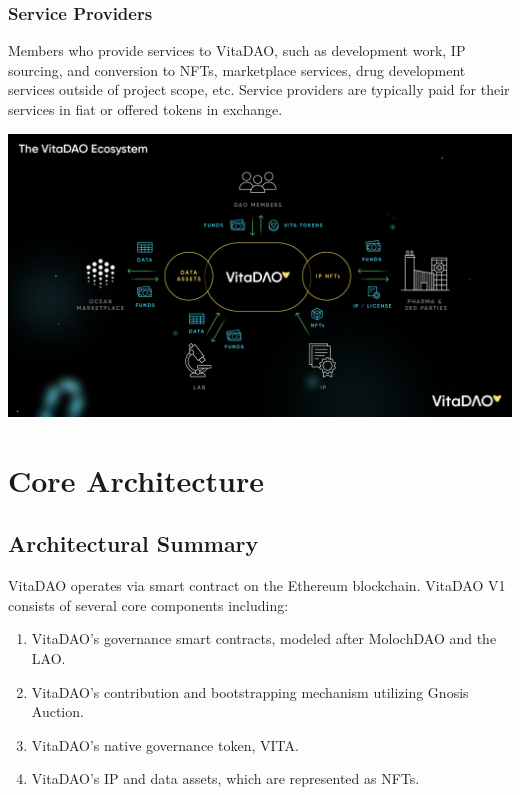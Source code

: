 \documentclass[12pt,letterpaper]{article}
\begin{document}
\subsubsection{Service Providers}
Members who provide services to VitaDAO, such as development work, IP sourcing, and conversion to NFTs, marketplace services, drug development services outside of project scope, etc. Service providers are typically paid for their services in fiat or offered tokens in exchange.

\vspace{15pt}
\begin{center}
\includegraphics[width=\linewidth]{images/VitaDAO Diagram - Ecosystem-p-1600.png} 
\end{center}

\section{Core Architecture}

\subsection{Architectural Summary}
VitaDAO operates via smart contract on the Ethereum blockchain. VitaDAO V1 consists of several core components including: 

\begin{enumerate}
\item VitaDAO’s governance smart contracts, modeled after MolochDAO and the LAO.
\item VitaDAO’s contribution and bootstrapping mechanism utilizing Gnosis Auction. 
\item VitaDAO’s native governance token, VITA.
\item VitaDAO’s IP and data assets, which are represented as NFTs. 
\end{enumerate}
\end{document}
